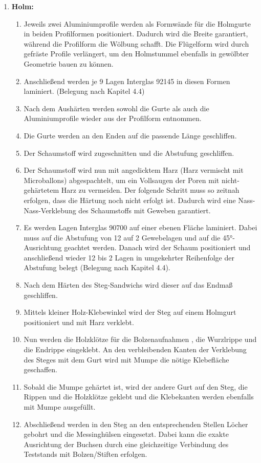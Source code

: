 \begin{enumerate}
	\item \textbf{Holm:}
	\begin{enumerate}
		\item Jeweils zwei Aluminiumprofile werden als Formwände für die Holmgurte in beiden Profilformen positioniert. Dadurch wird die Breite garantiert, während die Profilform die Wölbung schafft. Die Flügelform wird durch gefräste Profile verlängert, um den Holmstummel ebenfalls in gewölbter Geometrie bauen zu können. 
		\item Anschließend werden je 9 Lagen Interglas 92145 in diesen Formen laminiert. (Belegung nach Kapitel  4.4) 
		\item Nach dem Aushärten werden sowohl die Gurte als auch die Aluminiumprofile wieder aus der Profilform entnommen. 
		\item Die Gurte werden an den Enden auf die passende Länge geschliffen.
		\item Der Schaumstoff wird zugeschnitten und die Abstufung geschliffen.
		\item Der Schaumstoff wird nun mit angedicktem Harz (Harz vermischt mit Microballons) \glqq abgespachtelt\grqq, um ein Vollsaugen der Poren mit nicht-gehärtetem Harz zu vermeiden. Der folgende Schritt muss so zeitnah erfolgen, dass die Härtung noch nicht erfolgt ist. Dadurch wird eine Nass-Nass-Verklebung des Schaumstoffs mit Geweben garantiert.
		\item Es werden Lagen Interglas 90700 auf einer ebenen Fläche laminiert. Dabei muss auf die Abstufung von 12 auf 2 Gewebelagen und auf die 45°-Ausrichtung geachtet werden. Danach wird der Schaum positioniert und anschließend wieder 12 bis 2 Lagen in umgekehrter Reihenfolge der Abstufung belegt (Belegung nach Kapitel 4.4).
		\item Nach dem Härten des Steg-Sandwichs wird dieser auf das Endmaß geschliffen.
		\item Mittels kleiner Holz-Klebewinkel wird der Steg auf einem Holmgurt positioniert und mit Harz verklebt.
		\item Nun werden die Holzklötze für die Bolzenaufnahmen , die Wurzlrippe und die Endrippe eingeklebt. An den verbleibenden Kanten der Verklebung des Steges mit dem Gurt wird mit Mumpe die nötige Klebefläche geschaffen.
		\item Sobald die Mumpe gehärtet ist, wird der andere Gurt auf den Steg, die Rippen und die Holzklötze geklebt und die Klebekanten werden ebenfalls mit Mumpe ausgefüllt.
		\item Abschließend werden in den Steg an den entsprechenden Stellen Löcher gebohrt und die Messinghülsen eingesetzt. Dabei kann die exakte Ausrichtung der Buchsen durch eine gleichzeitige Verbindung des Teststands mit Bolzen/Stiften erfolgen.

\end{enumerate}
\end{enumerate}
